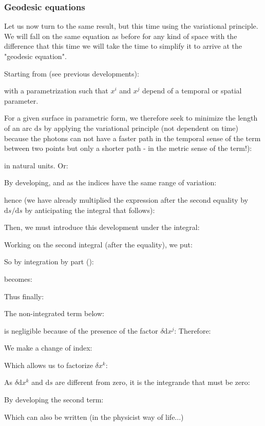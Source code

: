 	\subsubsection{Geodesic equations}\label{geodesic equation}
	Let us now turn to the same result, but this time using the variational principle. We will fall on the same equation as before for any kind of space with the difference that this time we will take the time to simplify it to arrive at the "geodesic equation".

	Starting from (see previous developments):
	
	with a parametrization such that $x^i$ and $x^j$ depend of a temporal or spatial parameter.

	For a given surface in parametric form, we therefore seek to minimize the length of an arc $\mathrm{d}s$ by applying the variational principle (not dependent on time) because the photons can not have a faster path in the temporal sense of the term between two points but only a shorter path - in the metric sense of the term!):
	
	in natural units. Or:
	
	By developing, and as the indices have the same range of variation:
	
	hence (we have already multiplied the expression after the second equality by $\mathrm{d}s/\mathrm{d}s$ by anticipating the integral that follows):
	
	Then, we must introduce this development under the integral:
	
	Working on the second integral (after the equality), we put:
	
	So by integration by part ():
	
	becomes:
	
	Thus finally:
	
	The non-integrated term below:
	
	is negligible because of the presence of the factor $\delta \mathrm{d}x^j$:
	Therefore:
	
	We make a change of index:
	
	Which allows us to factorize $\delta x^k$:
	
	As $\delta \mathrm{d}x^k$ and $\mathrm{d}s$ are different from zero, it is the integrande that must be zero:
	
	By developing the second term:
	
	Which can also be written (in the physicist way of life...)
	
